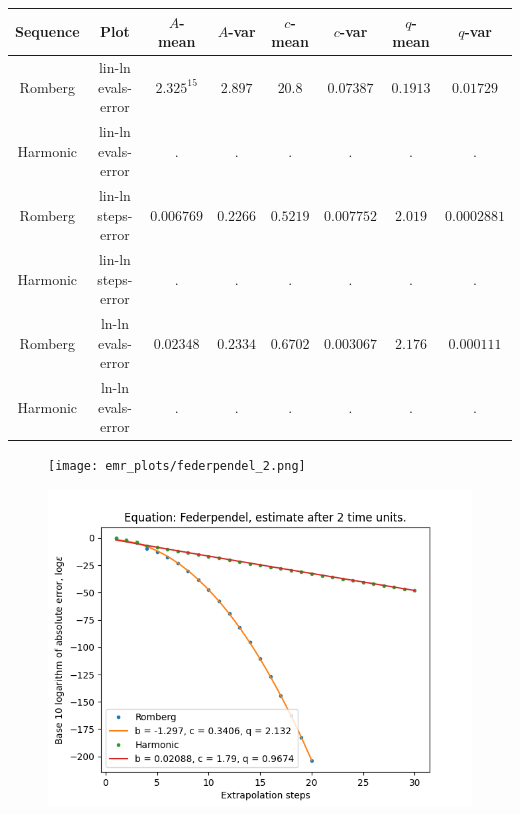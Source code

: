 \begin{table}[H]
    \centering
    \small
     \begin{tabular}{c|c||c|c|c|c|c|c}
Sequence & Plot & \(A\)-mean & \(A\)-var & \(c\)-mean & \(c\)-var & \(q\)-mean & \(q\)-var\\\hline
Romberg & lin-ln evals-error & \(2.325^{15}\) & \(2.897\) & \(20.8\) & \(0.07387\) & \(0.1913\) & \(0.01729\) \\
Harmonic & lin-ln evals-error & . & . & . & . & . & . \\
Romberg & lin-ln steps-error & \(0.006769\) & \(0.2266\) & \(0.5219\) & \(0.007752\) & \(2.019\) & \(0.0002881\) \\
Harmonic & lin-ln steps-error & . & . & . & . & . & . \\
Romberg & ln-ln evals-error & \(0.02348\) & \(0.2334\) & \(0.6702\) & \(0.003067\) & \(2.176\) & \(0.000111\) \\
Harmonic & ln-ln evals-error & . & . & . & . & . & . \\
    \end{tabular}
    \label{tab:my_label}
\end{table}


\begin{figure}[H]
\centering
\begin{minipage}{0.45\textwidth}
\centering
\texttt{[image: emr\_plots/federpendel\_2.png]}
\end{minipage}
\begin{minipage}{0.45\textwidth}
\centering
\includegraphics[scale=0.45]{emr_plots/federpendel_2_hp_steps.png}
\end{minipage}
\end{figure}

